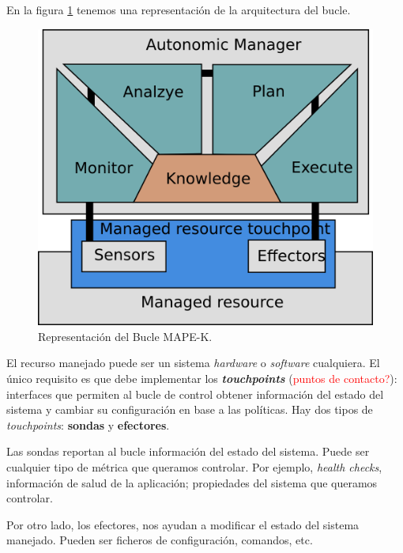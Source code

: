En la figura \ref{fig:bucle-mapek} tenemos una representación de la arquitectura del bucle.

\begin{figure}[h]
  \centering
  \includegraphics{01_introduccion/images/bucle-mape-k.png}
  \caption[Representación del Bucle MAPE-K]{Representación del Bucle MAPE-K.\footnotemark}
  \label{fig:bucle-mapek}
\end{figure}



El recurso manejado puede ser un sistema \emph{hardware} o \emph{software} cualquiera. El único requisito es que debe implementar los \textbf{\emph{touchpoints}} (\textcolor{red}{puntos de contacto?}): interfaces que permiten al bucle de control obtener información del estado del sistema y cambiar su configuración en base a las políticas. Hay dos tipos de \emph{touchpoints}: \textbf{sondas} y \textbf{efectores}.

Las sondas reportan al bucle información del estado del sistema. Puede ser cualquier tipo de métrica que queramos controlar. Por ejemplo, \emph{health checks}, información de salud de la aplicación; propiedades del sistema que queramos controlar.

Por otro lado, los efectores, nos ayudan a modificar el estado del sistema manejado. Pueden ser ficheros de configuración, comandos, etc.

